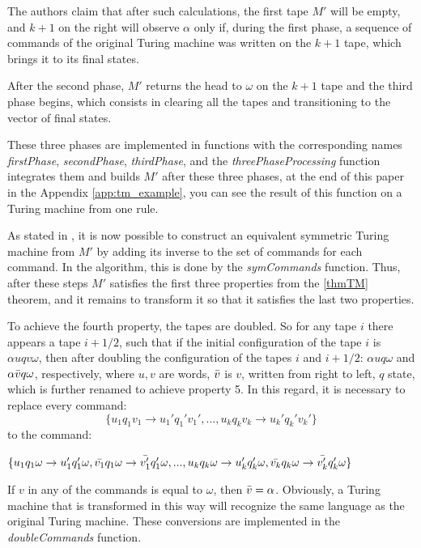 \documentclass[conference]{IEEEtran}
\theoremstyle{definition}
\begin{document}
The authors claim that after such calculations, the first tape $ M '$ will be empty, and $ k + 1 $ on the right will observe $ \alpha $ only if, during the first phase, a sequence of commands of the original Turing machine was written on the $ k + 1 $ tape, which brings it to its final states.

After the second phase, $ M '$ returns the head to $ \omega $ on the $ k + 1 $ tape and the third phase begins, which consists in clearing all the tapes and transitioning to the vector of final states.

These three phases are implemented in functions with the corresponding names \textit{firstPhase}, \textit{secondPhase}, \textit{thirdPhase}, and the \textit{threePhaseProcessing} function integrates them and builds $ M '$ after these three phases, at the end of this paper in the Appendix \ref{app:tm_example}, you can see the result of this function on a Turing machine from one rule.

As stated in \cite{symTM}, it is now possible to construct an equivalent symmetric Turing machine from $ M'$ by adding its inverse to the set of commands for each command. In the algorithm, this is done by the \textit{symCommands} function.
Thus, after these steps $ M '$ satisfies the first three properties from the \ref{thmTM} theorem, and it remains to transform it so that it satisfies the last two properties.

To achieve the fourth property, the tapes are doubled. So for any tape $ i $ there appears a tape $ i + 1/2 $, such that if the initial configuration of the tape $ i $ is $ \alpha uqv \omega $, then after doubling the configuration of the tapes $ i $ and $ i + 1/2 $: $ \alpha uq \omega $ and $ \alpha \Bar{v} q \omega $, respectively, where $ u, v $ are words, $ \Bar{v} $ is $ v $, written from right to left, $ q $ state, which is further renamed to achieve property 5. In this regard, it is necessary to replace every command:
$$\{ u_1 q_1 v_1 \to u_1' q_1' v_1',  ... , u_k q_k v_k \to u_k' q_k' v_k' \}$$
to the command:
\begin{center}
    $\{ u_1 q_1 \omega \to u_1' q_1' \omega, \Bar{v_1} q_1 \omega \to \Bar{v'_1} q_1' \omega , ... , \newline
    u_k q_k \omega \to u_k' q_k' \omega, \Bar{v_k} q_k \omega \to \Bar{v'_k} q_k' \omega \}$
\end{center}

If $ v $ in any of the commands is equal to $ \omega $, then $ \Bar{v} = \alpha $. Obviously, a Turing machine that is transformed in this way will recognize the same language as the original Turing machine. These conversions are implemented in the \textit{doubleCommands} function.
\end{document}
